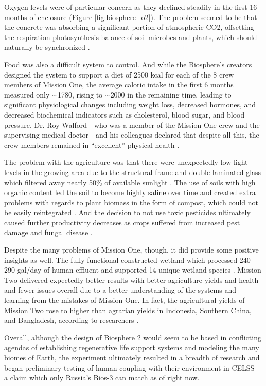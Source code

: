Oxygen levels were of particular concern as they declined steadily in the first 16 months of enclosure (Figure \ref{fig:biosphere_o2}). The problem seemed to be that the concrete was absorbing a significant portion of atmospheric CO2, offsetting the respiration-photosynthesis balance of soil microbes and plants, which should naturally be synchronized \cite{biosphere_o2}.

Food was also a difficult system to control. And while the Biosphere’s creators designed the system to support a diet of 2500 kcal for each of the 8 crew members of Mission One, the average caloric intake in the first 6 months measured only $\sim$1780, rising to $\sim$2000 in the remaining time, leading to significant physiological changes including weight loss, decreased hormones, and decreased biochemical indicators such as cholesterol, blood sugar, and blood pressure. Dr. Roy Walford—who was a member of the Mission One crew and the supervising medical doctor—and his colleagues declared that despite all this, the crew members remained in “excellent” physical health \cite{biosphere_diet}.

The problem with the agriculture was that there were unexpectedly low light levels in the growing area due to the structural frame and double laminated glass which filtered away nearly 50\% of available sunlight \cite{biosphere_design}. The use of soils with high organic content led the soil to become highly saline over time and created extra problems with regards to plant biomass in the form of compost, which could not be easily reintegrated \cite{biosphere_agriculture}. And the decision to not use toxic pesticides ultimately caused further productivity decreases as crops suffered from increased pest damage and fungal disease \cite{biosphere_agriculture}.

Despite the many problems of Mission One, though, it did provide some positive insights as well. The fully functional constructed wetland which processed 240-290 gal/day of human effluent and supported 14 unique wetland species \cite{biosphere_wastewater}. Mission Two delivered expectedly better results with better agriculture yields and health and fewer issues overall due to a better understanding of the systems and learning from the mistakes of Mission One. In fact, the agricultural yields of Mission Two rose to higher than agrarian yields in Indonesia, Southern China, and Bangladesh, according to researchers \cite{biosphere_agriculture}.

Overall, although the design of Biosphere 2 would seem to be based in conflicting agendas of establishing regenerative life support systems and modeling the many biomes of Earth, the experiment ultimately resulted in a breadth of research and began preliminary testing of human coupling with their environment in CELSS---a claim which only Russia’s Bios-3 can match as of right now.